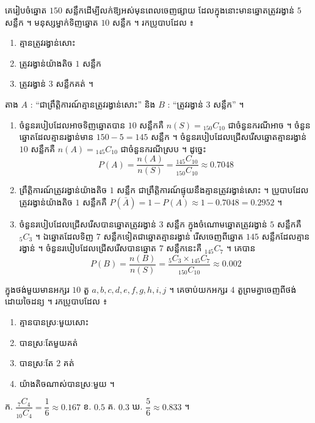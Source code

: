 \begin{example}[លំហាត់គំរូ ២]
គេរៀបចំឆ្នោត $150$ សន្លឹកដើម្បីលក់ឱ្យអស់មុនពេលចេញផ្សាយ ដែលក្នុងនោះមានឆ្នោតត្រូវរង្វាន់ $5$ សន្លឹក ។ មនុស្សម្នាក់ទិញឆ្នោត $10$ សន្លឹក ។ រកប្រូបាបដែល ៖
\begin{enumerate}[a]
  \item គ្មានត្រូវរង្វាន់សោះ
  \item ត្រូវរង្វាន់យ៉ាងតិច $1$ សន្លឹក
  \item ត្រូវរង្វាន់ $3$ សន្លឹកគត់ ។
\end{enumerate}
\ans
តាង $A$ : “ជាព្រឹត្តិការណ៍គ្មានត្រូវរង្វាន់សោះ” និង $B$ : “ត្រូវរង្វាន់ $3$ សន្លឹក” ។
\begin{enumerate}[a]
  \item ចំនួនរបៀបដែលអាចទិញឆ្នោតបាន $10$ សន្លឹកគឺ $n(S) = {}_{150}C_{10}$ ជាចំនួនករណីអាច ។ ចំនួនឆ្នោតដែលគ្មានរង្វាន់មាន $150 - 5 = 145$ សន្លឹក ។ ចំនួនរបៀបដែលជ្រើសរើសឆ្នោតគ្មានរង្វាន់ $10$ សន្លឹកគឺ $n(A) = {}_{145}C_{10}$ ជាចំនួនករណីស្រប ។ ដូច្នេះ
  \[
  P(A) = \frac{n(A)}{n(S)} = \frac{{}_{145}C_{10}}{{}_{150}C_{10}} \approx 0.7048
  \]
  \item ព្រឹត្តិការណ៍ត្រូវរង្វាន់យ៉ាងតិច $1$ សន្លឹក ជាព្រឹត្តិការណ៍ផ្ទុយនឹងគ្មានត្រូវរង្វាន់សោះ ។ ប្រូបាបដែលត្រូវរង្វាន់យ៉ាងតិច $1$ សន្លឹកគឺ $P(\bar{A}) = 1 - P(A) \approx 1 - 0.7048 = 0.2952$ ។
  \item ចំនួនរបៀបដែលជ្រើសរើសបានឆ្នោតត្រូវរង្វាន់ $3$ សន្លឹក ក្នុងចំណោមឆ្នោតត្រូវរង្វាន់ $5$ សន្លឹកគឺ ${}_5C_3$ ។ ឯឆ្នោតដែលទិញ $7$ សន្លឹកទៀតជាឆ្នោតគ្មានរង្វាន់ រើសចេញពីឆ្នោត $145$ សន្លឹកដែលគ្មានរង្វាន់ ។ ចំនួនរបៀបដែលជ្រើសរើសបានឆ្នោត $7$ សន្លឹកនេះគឺ ${}_{145}C_7$ ។ គេបាន
  \[
  P(B) = \frac{n(B)}{n(S)} = \frac{{}_5C_3\times{}_{145}C_7}{{}_{150}C_{10}} \approx 0.002
  \]
\end{enumerate}
\end{example}

\begin{pro}
ក្នុងថង់មួយមានអក្សរ $10$ តួ $a, b, c, d, e, f, g, h, i, j$ ។ គេចាប់យកអក្សរ $4$ តួព្រមគ្នាចេញពីថង់ដោយចៃដន្យ ។ រកប្រូបាបដែល ៖
\begin{enumerate}[a]
  \item គ្មានបានស្រៈមួយសោះ
  \item បានស្រៈតែមួយគត់
  \item បានស្រៈតែ $2$ គត់
  \item យ៉ាងតិចណាស់បានស្រៈមួយ ។
\end{enumerate}
\ans
ក. $\dfrac{{}_7C_4}{{}_{10}C_4} = \dfrac{1}{6} \approx 0.167$ \quad ខ. $0.5$ \quad គ. $0.3$ \quad ឃ. $\dfrac{5}{6} \approx 0.833$ ។
\end{pro}

